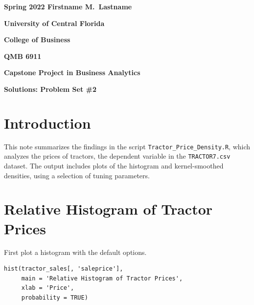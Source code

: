 \documentclass[11pt]{book}
\begin{document}

\pagestyle{empty}
{\noindent\bf Spring 2022 \hfill Firstname M.~Lastname}
\vskip 16pt
\centerline{\bf University of Central Florida}
\centerline{\bf College of Business}
\vskip 16pt
\centerline{\bf QMB 6911}
\centerline{\bf Capstone Project in Business Analytics}
\vskip 10pt
\centerline{\bf Solutions:  Problem Set \#2}
\vskip 32pt
\noindent

\section{Introduction}

This note summarizes the findings in the script
\texttt{Tractor\_Price\_Density.R},
which analyzes the prices of tractors,
the dependent variable in the \texttt{TRACTOR7.csv} dataset.
The output includes plots of the histogram
and kernel-smoothed densities,
using a selection of tuning parameters.

\vfill
\pagebreak
\section{Relative Histogram of Tractor Prices}


First plot a histogram with the default options.

\begin{verbatim}
hist(tractor_sales[, 'saleprice'],
     main = 'Relative Histogram of Tractor Prices',
     xlab = 'Price',
     probability = TRUE)
\end{verbatim}
\end{document}
